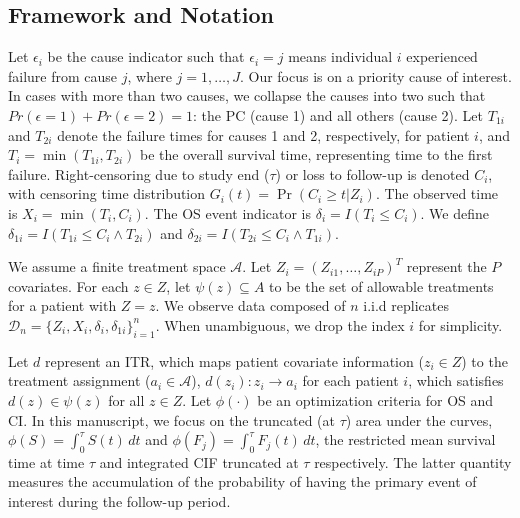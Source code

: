 \subsection{Framework and Notation}
\label{sec:frameworknotation}

Let $\epsilon_i$ be the cause indicator such that $\epsilon_i = j$ means individual $i$ experienced failure from cause $j$, where $j = 1,\dots,J$. Our focus is on a priority cause of interest. In cases with more than two causes, we collapse the causes into two such that $Pr(\epsilon = 1) + Pr(\epsilon = 2) = 1$: the PC (cause 1) and all others (cause 2).
Let $T_{1i}$ and $T_{2i}$ denote the failure times for causes 1 and 2, respectively, for patient $i$, and $T_i = \min(T_{1i}, T_{2i})$ be the overall survival time, representing time to the first failure. Right-censoring due to study end ($\tau$) or loss to follow-up is denoted $C_i$, with censoring time distribution $G_i(t) = \Pr(C_i \geq t | Z_i)$. The observed time is $X_i = \min(T_i, C_i)$. The OS event indicator is $\delta_{i} = I(T_i \le C_i)$. We define $\delta_{1i} = I(T_{1i} \le C_i\wedge T_{2i})$ and $\delta_{2i} = I(T_{2i} \le C_i\wedge T_{1i})$. 

We assume a finite treatment space $\mathcal{A}$. Let $Z_i = (Z_{i1},\dots,Z_{iP})^T$ represent the $P$ covariates. For each $z \in Z$, let $\psi(z) \subseteq A$ to be the set of allowable treatments for a patient with $Z = z$. We observe data composed of $n$ i.i.d replicates $\mathcal{D}_n = \{ Z_i, X_i, \delta_{i}, \delta_{1i} \}_{i=1}^n$. When unambiguous, we drop the index $i$ for simplicity. 

Let $d$ represent an ITR, which maps patient covariate information ($z_i \in Z$) to the treatment assignment ($a_i \in \mathcal{A}$), $d(z_i): z_i \rightarrow a_i$ for each patient $i$, which satisfies $d(z) \in \psi(z)$ for all $z \in Z$.
Let $\phi(\cdot)$ be an optimization criteria for OS and CI. In this manuscript, we focus on the truncated (at $\tau$) area under the curves, $\phi(S) =\int_0^\tau S(t) \, dt$ and $\phi(F_j) = \int_0^\tau F_j(t) \, dt$, the restricted mean survival time at time $\tau$ and integrated CIF truncated at $\tau$ respectively. The latter quantity measures the accumulation of the probability of having the primary event of interest during the follow-up period.

